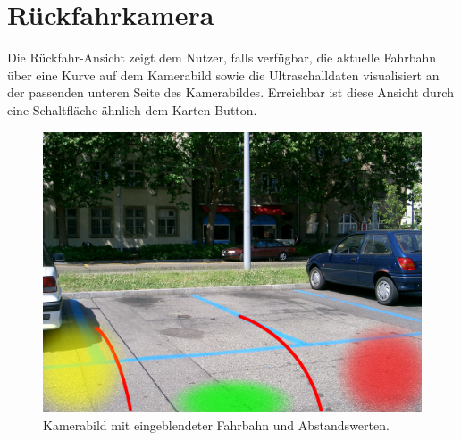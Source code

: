 \documentclass[pflichtenheft.tex]{subfiles}
\begin{document}
\clearpage
\section{Rückfahrkamera}

Die Rückfahr-Ansicht zeigt dem Nutzer, falls verfügbar, die aktuelle Fahrbahn über eine Kurve auf dem Kamerabild sowie die Ultraschalldaten visualisiert an der passenden unteren Seite des Kamerabildes. Erreichbar ist diese Ansicht durch eine Schaltfläche ähnlich dem Karten-Button.

\begin{figure}[H]
  	\begin{center}
 		\includegraphics[width=\textwidth]{Images/GUI-BackDrive.jpg}
  		\caption{Kamerabild mit eingeblendeter Fahrbahn und Abstandswerten.}
  	\end{center}
\end{figure}
\end{document}
